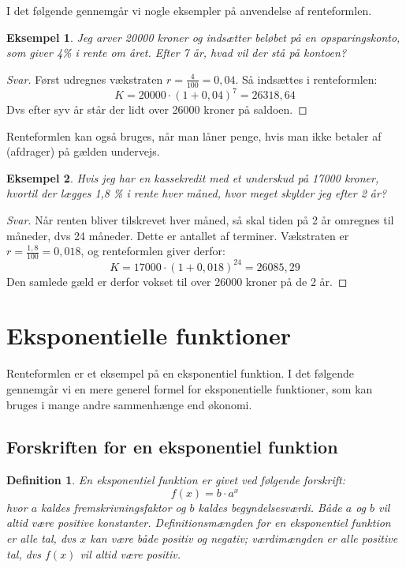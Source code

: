 \documentclass[12pt,oneside,a4paper]{article}
\theoremstyle{plain}
\newtheorem*{mydef}{Definition}
\newtheorem*{eks}{Eksempel}
\begin{document}
I det følgende gennemgår vi nogle eksempler på anvendelse af renteformlen.
\begin{eks}
    Jeg arver 20000 kroner og indsætter beløbet på en opsparingskonto, som
    giver 4\% i rente om året. Efter 7 år, hvad vil der stå på kontoen?
\end{eks}
\begin{proof}[Svar]
    Først udregnes vækstraten $r=\frac{4}{100} = 0,04$. Så indsættes i renteformlen:
    $$
    K = 20000 \cdot (1 + 0,04)^7 = 26318,64
    $$
    Dvs efter syv år står der lidt over 26000 kroner på saldoen.
\end{proof}

Renteformlen kan også bruges, når man låner penge, hvis man ikke betaler af
(afdrager) på gælden undervejs.
\begin{eks}
    Hvis jeg har en kassekredit med et underskud på 17000 kroner, hvortil der
    lægges 1,8 \% i rente hver måned, hvor meget skylder jeg efter 2 år?
\end{eks}
\begin{proof}[Svar]
    Når renten bliver tilskrevet hver måned, så skal tiden på 2 år omregnes til
    måneder, dvs 24 måneder. Dette er antallet af terminer. Vækstraten er $r =
    \frac{1,8}{100} = 0,018$, og renteformlen giver derfor:
    $$
    K = 17000 \cdot (1 + 0,018)^{24} = 26085,29
    $$
    Den samlede gæld er derfor vokset til over 26000 kroner på de 2 år.
\end{proof}

\section*{Eksponentielle funktioner}
Renteformlen er et eksempel på en eksponentiel funktion. I det følgende
gennemgår vi en mere generel formel for eksponentielle funktioner, som kan
bruges i mange andre sammenhænge end økonomi.

\subsection*{Forskriften for en eksponentiel funktion}
\begin{mydef}
    En eksponentiel funktion er givet ved følgende forskrift:
    $$
    f(x) = b\cdot a^x
    $$
    hvor $a$ kaldes {\em fremskrivningsfaktor} og $b$ kaldes {\em
    begyndelsesværdi}. Både $a$ og $b$ vil altid være positive konstanter.
    Definitionsmængden for en eksponentiel funktion er alle tal, dvs $x$ kan
    være både positiv og negativ; værdimængden er alle positive tal, dvs
    $f(x)$ vil altid være positiv.
\end{mydef}
\end{document}
